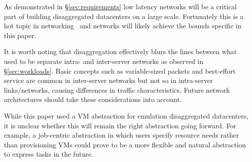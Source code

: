 As demonstrated in \S\ref{sec:requirements} low latency networks will be a critical part of building  disaggregated datacenters on a large scale. Fortunately this is a hot topic in networking~\cite{lowlatency, pfabric} and networks will likely achieve the bounds specific in this paper.

It is worth noting that disaggregation effectively blurs the lines between what used to be separate intra- and inter-server networks as observed in \S\ref{sec:workloads}. Basic concepts such as variable-sized packets and best-effort service are common in inter-server networks but not so in intra-server links/networks, causing differences in traffic characteristics. Future network architectures should take these considerations into account.

While this paper used a VM abstraction for emulation disaggregated datacenters, it is unclear whether this will remain the right abstraction going forward. For example, a job-centric abstraction in which users specify resource needs rather than provisioning VMs could prove to be a more flexible and natural abstraction to express tasks in the future.


